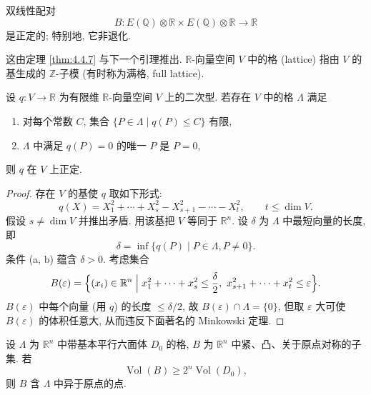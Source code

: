 \begin{theorem} \label{thm:4.6.1} 
双线性配对
\[
B\colon E(\mathbb{Q})\otimes\mathbb{R}\times E(\mathbb{Q})\otimes\mathbb{R}\to\mathbb{R}
\]
是正定的; 特别地, 它非退化.
\end{theorem}

这由定理 \ref{thm:4.4.7} 与下一个引理推出. $\mathbb{R}$-向量空间 $V$ 中的格 (lattice) 指由 $V$ 的基生成的 $\mathbb{Z}$-子模 (有时称为满格, full lattice).

\begin{lemma} \label{thm:4.6.2} 
设 $q\colon V\to\mathbb{R}$ 为有限维 $\mathbb{R}$-向量空间 $V$ 上的二次型. 若存在 $V$ 中的格 $\Lambda$ 满足
\begin{enumerate}[label=\textup{(\alph*)}]
\item 对每个常数 $C$, 集合 $\{P\in\Lambda \mid q(P)\le C\}$ 有限,
\item $\Lambda$ 中满足 $q(P) = 0$ 的唯一 $P$ 是 $P = 0$,
\end{enumerate}
则 $q$ 在 $V$ 上正定.
\end{lemma}

\begin{proof}
存在 $V$ 的基使 $q$ 取如下形式:
\[
q(X) = X_1^2 + \cdots + X_s^2 - X_{s+1}^2 - \cdots - X_t^2, \qquad t\le\dim V.
\]
假设 $s\neq\dim V$ 并推出矛盾. 用该基把 $V$ 等同于 $\mathbb{R}^n$. 设 $\delta$ 为 $\Lambda$ 中最短向量的长度, 即
\[
\delta = \inf\{q(P) \mid P\in\Lambda, P\neq 0\}.
\]
条件 (a, b) 蕴含 $\delta > 0$. 考虑集合
\[
B(\varepsilon) = \Bigl\{(x_i)\in\mathbb{R}^n \;\Big|\; x_1^2 + \cdots + x_s^2\le\frac{\delta}{2}, \ x_{s+1}^2 + \cdots + x_t^2\le\varepsilon\Bigr\}.
\]
$B(\varepsilon)$ 中每个向量 (用 $q$) 的长度 $\le\delta/2$, 故 $B(\varepsilon)\cap\Lambda = \{0\}$, 但取 $\varepsilon$ 大可使 $B(\varepsilon)$ 的体积任意大, 从而违反下面著名的 Minkowski 定理.
\end{proof}

\begin{theorem}[Minkowski] \label{thm:4.6.3} 
设 $\Lambda$ 为 $\mathbb{R}^n$ 中带基本平行六面体 $D_0$ 的格, $B$ 为 $\mathbb{R}^n$ 中紧、凸、关于原点对称的子集. 若
\[
\operatorname{Vol}(B)\ge 2^n\operatorname{Vol}(D_0),
\]
则 $B$ 含 $\Lambda$ 中异于原点的点.
\end{theorem}

